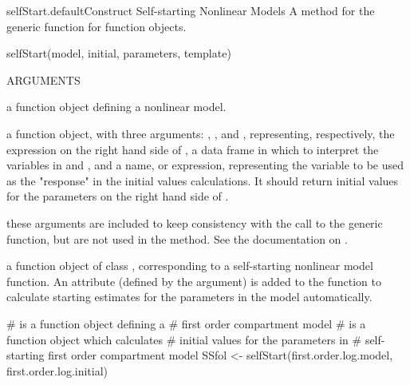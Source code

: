 \documentclass[pdftex]{article} \usepackage{url,graphicx}
\begin{document}
\begin{Helpfile}{selfStart.default}{Construct Self-starting Nonlinear Models}
A method for the generic function  for function objects.
\begin{Example}
selfStart(model, initial, parameters, template)
\end{Example}
\begin{Argument}{ARGUMENTS}
\item[\Co{model:}]
a function object defining a nonlinear model.
\item[\Co{initial:}]
a function object, with three arguments: ,
, and , representing, respectively, the
expression on the right hand side of , a data frame in
which to interpret the variables in  and , and
a name, or expression, representing the variable to be used as the
"response" in the initial values calculations. It should return
initial values for the parameters on the right hand side of
. 
\item[\Co{parameters, template:}]
these arguments are included to keep
consistency with the call to the generic function, but are not used
in the  method. See the documentation on
.
\end{Argument}
a function object of class , corresponding to a
self-starting nonlinear model function. An  attribute
(defined by the  argument) is added to the function to
calculate starting estimates for the parameters in the model
automatically.
\need 15pt
\vspace{-16pt}
\begin{Example}
#  is a function object defining a 
# first order compartment model 
#  is a function object which calculates 
# initial values for the parameters in 
# self-starting first order compartment model
SSfol <- selfStart(first.order.log.model, first.order.log.initial)
\end{Example}
\end{Helpfile}
\end{document}
